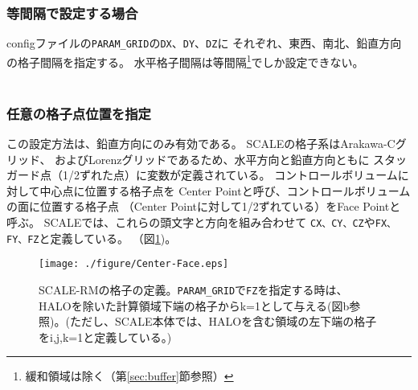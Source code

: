 \subsubsection{等間隔で設定する場合}
configファイルの\verb|PARAM_GRID|の\verb|DX|、\verb|DY|、\verb|DZ|に
それぞれ、東西、南北、鉛直方向の格子間隔を指定する。
水平格子間隔は等間隔\footnote{緩和領域は除く（第\ref{sec:buffer}節参照）}でしか設定できない。\\

\\


\subsubsection{任意の格子点位置を指定}
この設定方法は、鉛直方向にのみ有効である。
SCALEの格子系はArakawa-Cグリッド、
およびLorenzグリッドであるため、水平方向と鉛直方向ともに
スタッガード点（1/2ずれた点）に変数が定義されている。
コントロールボリュームに対して中心点に位置する格子点を
Center Pointと呼び、コントロールボリュームの面に位置する格子点
（Center Pointに対して1/2ずれている）をFace Pointと呼ぶ。
SCALEでは、これらの頭文字と方向を組み合わせて
\verb|CX、CY、CZ|や\verb|FX、FY、FZ|と定義している。
（図\ref{fig:scale_grid})。


\begin{figure}[h]
\begin{center}
  \texttt{[image: ./figure/Center-Face.eps]}\\
  \caption{SCALE-RMの格子の定義。\verb|PARAM_GRID|で\verb|FZ|を指定する時は、HALOを除いた計算領域下端の格子からk=1として与える(図b参照)。(ただし、SCALE本体では、HALOを含む領域の左下端の格子をi,j,k=1と定義している。)}
  \label{fig:scale_grid}
\end{center}
\end{figure}

